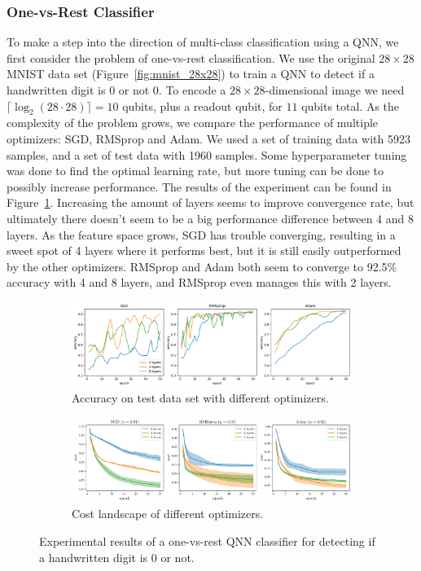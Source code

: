 \documentclass[a4paper,10pt]{article}
\begin{document}
\subsubsection{One-vs-Rest Classifier}
To make a step into the direction of multi-class classification using a QNN, we first consider the problem of one-vs-rest classification.
We use the original $28 \times 28$ MNIST data set (Figure~\ref{fig:mnist_28x28}) to train a QNN to detect if a handwritten digit is 0 or not 0.
To encode a $28 \times 28$-dimensional image we need $\lceil \log_2(28 \cdot 28) \rceil = 10$ qubits, plus a readout qubit, for $11$ qubits total.
As the complexity of the problem grows, we compare the performance of multiple optimizers: SGD, RMSprop and Adam.
We used a set of training data with 5923 samples, and a set of test data with 1960 samples.
Some hyperparameter tuning was done to find the optimal learning rate, but more tuning can be done to possibly increase performance.
The results of the experiment can be found in Figure~\ref{fig:ovr_results}.
Increasing the amount of layers seems to improve convergence rate, but ultimately there doesn't seem to be a big performance difference between 4 and 8 layers.
As the feature space grows, SGD has trouble converging, resulting in a sweet spot of 4 layers where it performs best, but it is still easily outperformed by the other optimizers.
RMSprop and Adam both seem to converge to 92.5\% accuracy with 4 and 8 layers, and RMSprop even manages this with 2 layers.
\begin{figure}[ht]
	\centering
	\begin{subfigure}{1\textwidth}
		\centering
		\includegraphics[width=1\linewidth]{figures/qnn_ovr_accuracy.png}
		\caption{Accuracy on test data set with different optimizers.}
		\vspace*{4mm}
	\end{subfigure}
	\begin{subfigure}{1\textwidth}
		\centering
		\includegraphics[width=1\linewidth]{figures/qnn_ovr_cost}
		\caption{Cost landscape of different optimizers.}
	\end{subfigure}
	\caption{Experimental results of a one-vs-rest QNN classifier for detecting if a handwritten digit is 0 or not.}
	\label{fig:ovr_results}
\end{figure}
\end{document}
